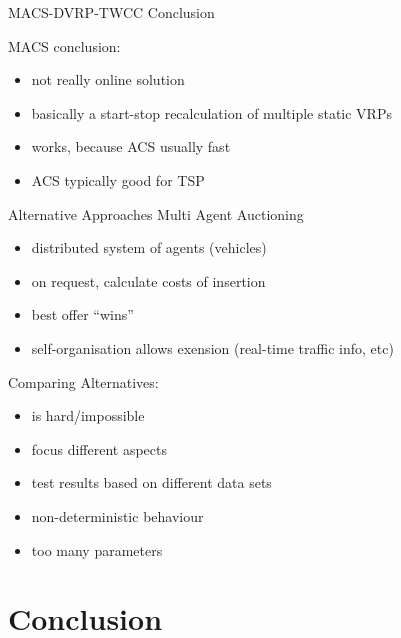 \documentclass{beamer}
\begin{document}
\begin{frame}{MACS-DVRP-TWCC Conclusion}

  MACS conclusion:
  \begin{itemize}
    \item not really online solution
    \item basically a start-stop recalculation of multiple static VRPs
    \item works, because ACS usually fast
    \item ACS typically good for TSP
  \end{itemize}

\end{frame}


\begin{frame}{Alternative Approaches}
  Multi Agent Auctioning
  \begin{itemize}
    \item distributed system of agents (vehicles)
    \item on request, calculate costs of insertion
    \item best offer ``wins''
    \item self-organisation allows exension (real-time traffic info, etc)
  \end{itemize}

  Comparing Alternatives:
  \begin{itemize}
    \item is hard/impossible
    \item focus different aspects
    \item test results based on different data sets
    \item non-deterministic behaviour
    \item too many parameters
  \end{itemize}

\end{frame}

\section[Conclusion]{Conclusion}
\end{document}
